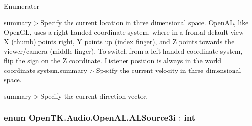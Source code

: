 \begin{Desc}
\item[Enumerator]\par
\begin{description}
\item[{\em 
\hypertarget{namespace_open_t_k_1_1_audio_1_1_open_a_l_a6c1ca07b104dd956910ef7cc10caa9eca52f5e0bc3859bc5f5e25130b6c7e8881}{Position}\label{namespace_open_t_k_1_1_audio_1_1_open_a_l_a6c1ca07b104dd956910ef7cc10caa9eca52f5e0bc3859bc5f5e25130b6c7e8881}
}]summary$>$Specify the current location in three dimensional space. \hyperlink{namespace_open_t_k_1_1_audio_1_1_open_a_l}{Open\-A\-L}, like Open\-G\-L, uses a right handed coordinate system, where in a frontal default view X (thumb) points right, Y points up (index finger), and Z points towards the viewer/camera (middle finger). To switch from a left handed coordinate system, flip the sign on the Z coordinate. Listener position is always in the world coordinate system.summary$>$Specify the current velocity in three dimensional space.\item[{\em 
\hypertarget{namespace_open_t_k_1_1_audio_1_1_open_a_l_a6c1ca07b104dd956910ef7cc10caa9eca88156d46910a2d733443c339a9231d12}{Velocity}\label{namespace_open_t_k_1_1_audio_1_1_open_a_l_a6c1ca07b104dd956910ef7cc10caa9eca88156d46910a2d733443c339a9231d12}
}]summary$>$Specify the current direction vector.\end{description}
\end{Desc}
\hypertarget{namespace_open_t_k_1_1_audio_1_1_open_a_l_a5038b3efb0e0b18183b96cc12b925987}{
\subsubsection[{A\-L\-Source3i}]{\setlength{\rightskip}{0pt plus 5cm}enum {\bf Open\-T\-K.\-Audio.\-Open\-A\-L.\-A\-L\-Source3i} \-: int}}\label{namespace_open_t_k_1_1_audio_1_1_open_a_l_a5038b3efb0e0b18183b96cc12b925987}


